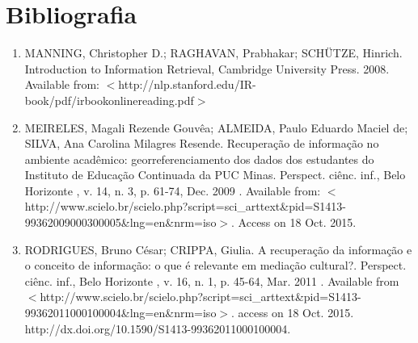 \chapter{Bibliografia}
\label{cap:bibliografia}

\begin{enumerate}
\item MANNING, Christopher D.; RAGHAVAN, Prabhakar; SCHÜTZE, Hinrich. Introduction to Information Retrieval, Cambridge University Press. 2008. Available from: $<$http://nlp.stanford.edu/IR-book/pdf/irbookonlinereading.pdf$>$

\item MEIRELES, Magali Rezende Gouvêa; ALMEIDA, Paulo Eduardo Maciel de; SILVA, Ana Carolina Milagres Resende. Recuperação de informação no ambiente acadêmico: georreferenciamento dos dados dos estudantes do Instituto de Educação Continuada da PUC Minas. Perspect. ciênc. inf.,  Belo Horizonte ,  v. 14, n. 3, p. 61-74, Dec.  2009 .   Available from: $<$http://www.scielo.br/scielo.php?script=sci\_arttext\&pid=S1413-99362009000300005\&lng=en\&nrm=iso$>$. Access on 18 Oct. 2015.




\item RODRIGUES, Bruno César; CRIPPA, Giulia. A recuperação da informação e o conceito de informação: o que é relevante em mediação cultural?. Perspect. ciênc. inf.,  Belo Horizonte ,  v. 16, n. 1, p. 45-64, Mar.  2011 .   Available from $<$http://www.scielo.br/scielo.php?script=sci\_arttext\&pid=S1413-99362011000100004\&lng=en\&nrm=iso$>$. access on  18  Oct.  2015.  http://dx.doi.org/10.1590/S1413-99362011000100004.
\end{enumerate}
